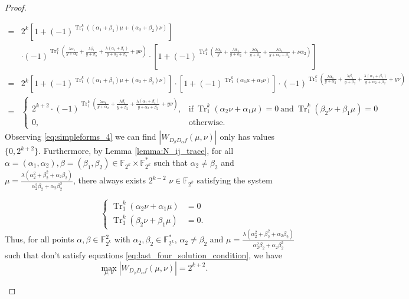 \documentclass{article}
\newcommand{\F}{\mathbb{F}}
\newcommand{\0}{\textbf{0}}
\newcommand{\1}{\textbf{1}}
\newcommand{\TRACE}{\operatorname{Tr}_1^k}
\theoremstyle{plain}
\theoremstyle{nonumberplain}
\begin{document}
\begin{proof}
\begin{enumerate}[label=\textbf{Case \arabic*}]
\begin{enumerate}[label=\textbf{Case \Alph{*}},itemindent=*,wide=\parindent]
\begin{align}
        =&2^k\left[1+(-1)^{\TRACE\left((\alpha_1+\beta_1)\mu+ (\alpha_2+\beta_2)\nu\right)}\right]\nonumber\\
        &\cdot
        (-1)^{\TRACE\left(\frac{\lambda\alpha_1}{y+\alpha_2}+\frac{\lambda\beta_1}{y+\beta_2}+\frac{\lambda(\alpha_1+\beta_1)}{y+\alpha_2+\beta_2}+ y\nu\right)}\cdot
        \left[1+(-1)^{\TRACE\left(\frac{\lambda\alpha_1}{y}+\frac{\lambda\alpha_1}{y+\alpha_2}+\frac{\lambda\alpha_1}{y+\beta_2}+\frac{\lambda\alpha_1}{y+\alpha_2+\beta_2}+\nu\alpha_2\right)}\right]\nonumber\\
        =&2^k\left[1+(-1)^{\TRACE\left((\alpha_1+\beta_1)\mu+ (\alpha_2+\beta_2)\nu\right)}\right]\cdot
        \left[1+(-1)^{\TRACE\left(\alpha_1\mu+\alpha_2\nu\right)}\right]\cdot
        (-1)^{\TRACE\left(\frac{\lambda\alpha_1}{y+\alpha_2}+\frac{\lambda\beta_1}{y+\beta_2}+\frac{\lambda(\alpha_1+\beta_1)}{y+\alpha_2+\beta_2}+ y\nu\right)}\nonumber\\
        =&\begin{cases}
            2^{k+2}\cdot(-1)^{\TRACE\left(\frac{\lambda\alpha_1}{y+\alpha_2}+\frac{\lambda\beta_1}{y+\beta_2}+\frac{\lambda(\alpha_1+\beta_1)}{y+\alpha_2+\beta_2}+ y\nu\right)},&\text{if}~\TRACE\left(\alpha_2\nu+\alpha_1\mu\right)=0 ~
            \text{and}~\TRACE\left(\beta_2\nu+\beta_1 \mu\right)=0 \\
            0,~&\text{otherwise}.
        \end{cases}
    \end{align}
    Observing \eqref{eq:simpleforms_4} we can find $ |W_{D_{\beta}D_{\alpha}f}(\mu,\nu)| $ only 
    has values $ \{0,2^{k+2}\} $. 
    Furthermore, by Lemma \ref{lemma:N_ij_trace}, 
    for all $ \alpha=(\alpha_1,\alpha_2),\beta=(\beta_1,\beta_2)\in\F_{2^k}\times\F_{2^k}^* $ such that 
    $ \alpha_2\ne\beta_2 $ and $ \mu=\frac{\lambda(\alpha_2^2+\beta_2^2+\alpha_2\beta_2)}{\alpha_2^2\beta_2+\alpha_2\beta_2^2} $, 
    there always exists $ 2^{k-2} $  $ \nu\in\F_{2^k} $ satisfying the system
    
        \begin{equation}\label{eq:max_foursolution_condition}\left\{
        \begin{alignedat}{2}
            \TRACE\left(\alpha_2\nu+\alpha_1\mu\right)&=0\\
            \TRACE\left(\beta_2\nu +\beta_1 \mu\right)&=0.
        \end{alignedat}\right.
\end{equation}
    Thus, for all points $ \alpha,\beta\in\F_{2^k}^2 $ with $ \alpha_2,\beta_2\in\F_{2^k}^* $, $ \alpha_2\ne\beta_2 $ 
    and $ \mu=\frac{\lambda(\alpha_2^2+\beta_2^2+\alpha_2\beta_2)}{\alpha_2^2\beta_2+\alpha_2\beta_2^2} $ 
    such that don't satisfy equations \eqref{eq:last_four_solution_condition}, we have 
    \[\max_{\mu,\nu}|W_{D_{\beta}D_{\alpha}f}(\mu,\nu)|=2^{k+2}.\]
    

\end{enumerate}
\end{enumerate}
\end{proof}
\end{document}
